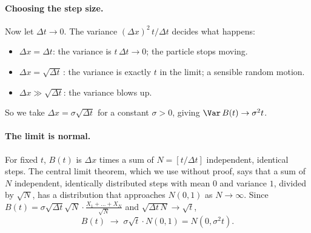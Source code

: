 \paragraph{Choosing the step size.} Now let $\Delta t\to0$. The variance $(\Delta x)^2\,t/\Delta t$ decides what happens:
\begin{itemize}
  \item $\Delta x=\Delta t$: the variance is $t\,\Delta t\to0$; the particle stops moving.
  \item $\Delta x=\sqrt{\Delta t}$\,: the variance is exactly $t$ in the limit; a sensible random motion.
  \item $\Delta x\gg\sqrt{\Delta t}$: the variance blows up.
\end{itemize}
So we take $\Delta x=\sigma\sqrt{\Delta t}$ for a constant $\sigma>0$, giving $\Var\,B(t)\to\sigma^2t$.

\begin{pic}
\end{pic}

\paragraph{The limit is normal.} For fixed $t$, $B(t)$ is $\Delta x$ times a sum of $N=[t/\Delta t]$ independent, identical steps. The central limit theorem, which we use without proof, says that a sum of $N$ independent, identically distributed steps with mean $0$ and variance $1$, divided by $\sqrt N$, has a distribution that approaches $N(0,1)$ as $N\to\infty$. Since $B(t)=\sigma\sqrt{\Delta t}\sqrt N\cdot\frac{X_1+\dots+X_N}{\sqrt N}$ and $\sqrt{\Delta t\,N}\to\sqrt t$,
\[
  B(t)\;\longrightarrow\;\sigma\sqrt t\cdot N(0,1)=N(0,\sigma^2t).
\]

